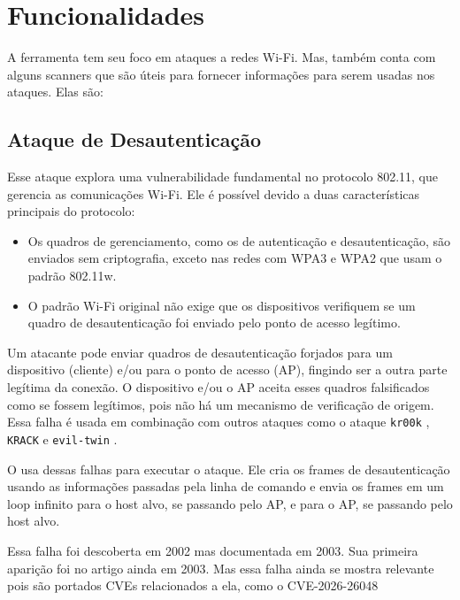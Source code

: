 \section{Funcionalidades}

A ferramenta tem seu foco em ataques a redes Wi-Fi. Mas, também conta com alguns scanners que são úteis para fornecer informações para serem usadas nos ataques. Elas são:


\subsection{\textbf{Ataque de Desautenticação}}
Esse ataque explora uma vulnerabilidade fundamental no protocolo 802.11, que gerencia as comunicações Wi-Fi. Ele é possível devido a duas características principais do protocolo:

\begin{itemize}
    \item Os quadros de gerenciamento, como os de autenticação e desautenticação, são enviados sem criptografia, exceto nas redes com WPA3 e WPA2 que usam o padrão 802.11w.

    \item O padrão Wi-Fi original não exige que os dispositivos verifiquem se um quadro de desautenticação foi enviado pelo ponto de acesso legítimo.
\end{itemize}

Um atacante pode enviar quadros de desautenticação forjados para um dispositivo (cliente) e/ou para o ponto de acesso (AP), fingindo ser a outra parte legítima da conexão. O dispositivo e/ou o AP aceita esses quadros falsificados como se fossem legítimos, pois não há um mecanismo de verificação de origem. Essa falha é usada em combinação com outros ataques como o ataque \texttt{kr00k} \cite{kr00k}, \texttt{KRACK} \cite{krack} e \texttt{evil-twin} \cite{evil-twin}.

O \offscan usa dessas falhas para executar o ataque. Ele cria os frames de desautenticação usando as informações passadas pela linha de comando e envia os frames em um loop infinito para o host alvo, se passando pelo AP, e para o AP, se passando pelo host alvo.

Essa falha foi descoberta em 2002 mas documentada em 2003. Sua primeira aparição foi no artigo \citet{80211-flaws} ainda em 2003. Mas essa falha ainda se mostra relevante pois são portados CVEs relacionados a ela, como o CVE-2026-26048 \cite{deauth-protecless}




